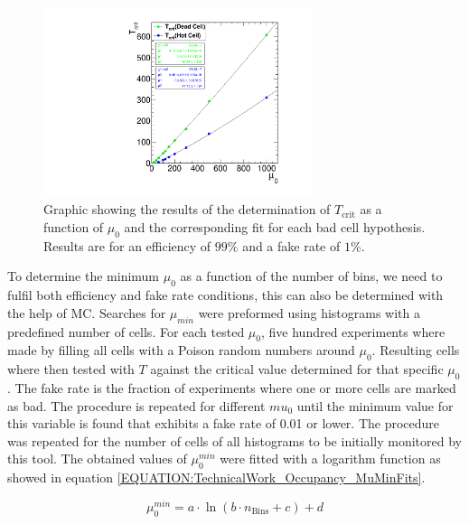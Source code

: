 \begin{figure}[!htb]
\centering
\includegraphics[width=0.70\textwidth]{Chapter03/L1TOnline/Images/L1TOccupancy_TCrit.pdf}
\caption[Graphic showing the results of the determination of $T_{\text{crit}}$ as a function of $\mu_0$ and the corresponding fit for each bad cell hypothesis.]
{Graphic showing the results of the determination of $T_{\text{crit}}$ as a function of $\mu_0$ and the corresponding fit for each bad cell hypothesis. Results are for an efficiency of $99\%$ and a fake rate of $1\%$.}
\label{FIGURE:TechnicalWork_L1TOccupancyTCrit}
\end{figure}

To determine the minimum $\mu_0$ as a function of the number of bins, we need to fulfil both efficiency and fake rate conditions, this can also be determined with the help of \gls{MC}. Searches for $\mu_{min}$ were preformed using histograms with a predefined number of cells. For each tested $\mu_{0}$, five hundred experiments where made by filling all cells with a Poison random numbers around $\mu_0$. Resulting cells where then tested with $T$ against the critical value determined for that specific $\mu_0$. The fake rate is the fraction of experiments where one or more cells are marked as bad. The procedure is repeated for different $mu_{0}$ until the minimum value for this variable is found that exhibits a fake rate of 0.01 or lower. The procedure was repeated for the number of cells of all histograms to be initially monitored by this tool. The obtained values of $\mu_0^{min}$ were fitted with a logarithm function as showed in equation \ref{EQUATION:TechnicalWork_Occupancy_MuMinFits}.

\begin{equation}
\mu_{0}^{min}= a \cdot \ln(b \cdot n_{\text{Bins}} + c) + d
\label{EQUATION:TechnicalWork_Occupancy_MuMinFits}
\end{equation}

